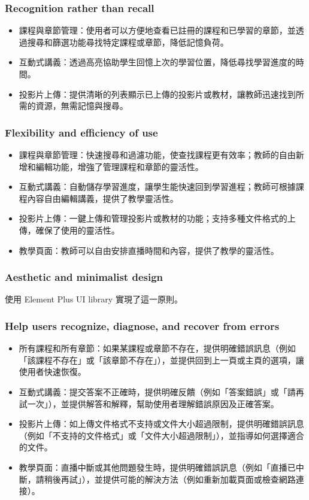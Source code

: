 \documentclass[12pt]{article}
\begin{document}
\subsubsection{Recognition rather than recall}

\begin{itemize}
  \item 課程與章節管理：使用者可以方便地查看已註冊的課程和已學習的章節，並透過搜尋和篩選功能尋找特定課程或章節，降低記憶負荷。
  \item 互動式講義：透過高亮協助學生回憶上次的學習位置，降低尋找學習進度的時間。
  \item 投影片上傳：提供清晰的列表顯示已上傳的投影片或教材，讓教師迅速找到所需的資源，無需記憶與搜尋。
\end{itemize}

\subsubsection{Flexibility and efficiency of use}

\begin{itemize}
  \item 課程與章節管理：快速搜尋和過濾功能，使查找課程更有效率；教師的自由新增和編輯功能，增強了管理課程和章節的靈活性。
  \item 互動式講義：自動儲存學習進度，讓學生能快速回到學習進程；教師可根據課程內容自由編輯講義，提供了教學靈活性。
  \item 投影片上傳：一鍵上傳和管理投影片或教材的功能；支持多種文件格式的上傳，確保了使用的靈活性。
  \item 教學頁面：教師可以自由安排直播時間和內容，提供了教學的靈活性。
\end{itemize}

\subsubsection{Aesthetic and minimalist design}

使用 Element Plus UI library 實現了這一原則。

\subsubsection{Help users recognize, diagnose, and recover from errors}

\begin{itemize}
  \item 所有課程和所有章節：如果某課程或章節不存在，提供明確錯誤訊息（例如「該課程不存在」或「該章節不存在」），並提供回到上一頁或主頁的選項，讓使用者快速恢復。
  \item 互動式講義：提交答案不正確時，提供明確反饋（例如「答案錯誤」或「請再試一次」），並提供解答和解釋，幫助使用者理解錯誤原因及正確答案。
  \item 投影片上傳：如上傳文件格式不支持或文件大小超過限制，提供明確錯誤訊息（例如「不支持的文件格式」或「文件大小超過限制」），並指導如何選擇適合的文件。
  \item 教學頁面：直播中斷或其他問題發生時，提供明確錯誤訊息（例如「直播已中斷，請稍後再試」），並提供可能的解決方法（例如重新加載頁面或檢查網路連接）。
\end{itemize}
\end{document}
